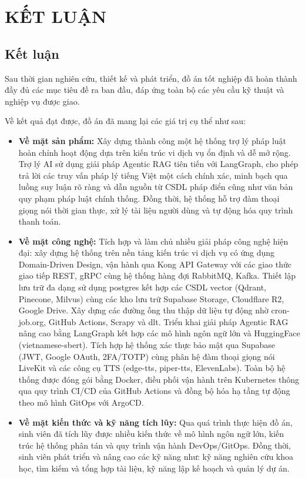 \newpage

{\centering \section*{KẾT LUẬN}}

\subsection*{Kết luận}

Sau thời gian nghiên cứu,
thiết kế và phát triển,
đồ án tốt nghiệp
đã hoàn thành đầy đủ các mục tiêu đề ra ban đầu,
đáp ứng toàn bộ các yêu cầu kỹ thuật
và nghiệp vụ được giao.

Về kết quả đạt được, đồ án đã mang lại các giá trị cụ thể như sau:

\begin{itemize}
\item \textbf{Về mặt sản phẩm:}
Xây dựng thành công một hệ thống trợ lý pháp luật hoàn chỉnh
hoạt động dựa trên kiến trúc vi dịch vụ
ổn định và dễ mở rộng.
Trợ lý AI sử dụng giải pháp Agentic RAG tiên tiến với LangGraph,
cho phép trả lời các truy vấn pháp lý tiếng Việt một cách chính xác,
minh bạch qua luồng suy luận rõ ràng và dẫn nguồn từ CSDL pháp điển cũng như văn bản quy phạm pháp luật chính thống.
Đồng thời, hệ thống hỗ trợ đàm thoại giọng nói thời gian thực, xử lý tài liệu người dùng và tự động hóa quy trình thanh toán.

\item \textbf{Về mặt công nghệ:}
Tích hợp và làm chủ nhiều giải pháp công nghệ hiện đại:
xây dựng hệ thống trên nền tảng kiến trúc vi dịch vụ
có ứng dụng Domain-Driven Design,
vận hành qua Kong API Gateway
với các giao thức giao tiếp REST, gRPC
cùng hệ thống hàng đợi RabbitMQ, Kafka.
Thiết lập lưu trữ đa dạng sử dụng postgres
kết hợp các CSDL vector (Qdrant, Pinecone, Milvus)
cùng các kho lưu trữ Supabase Storage, Cloudflare R2, Google Drive.
Xây dựng các đường ống thu thập dữ liệu
tự động nhờ cron-job.org, GitHub Actions, Scrapy và dlt.
Triển khai giải pháp Agentic RAG nâng cao bằng LangGraph
kết hợp các mô hình ngôn ngữ lớn
và HuggingFace (vietnamese-sbert).
Tích hợp hệ thống xác thực bảo mật qua Supabase (JWT, Google OAuth, 2FA/TOTP)
cùng phân hệ đàm thoại giọng nói LiveKit
và các công cụ TTS (edge-tts, piper-tts, ElevenLabs).
Toàn bộ hệ thống được đóng gói bằng Docker,
điều phối vận hành trên Kubernetes
thông qua quy trình CI/CD của GitHub Actions
và đồng bộ hóa hạ tầng tự động theo mô hình GitOps với ArgoCD.

\item \textbf{Về mặt kiến thức và kỹ năng tích lũy:}
Qua quá trình thực hiện đồ án,
sinh viên đã tích lũy được nhiều kiến thức
về
mô hình ngôn ngữ lớn,
kiến trúc hệ thống phân tán
và quy trình vận hành DevOps/GitOps.
Đồng thời, sinh viên phát triển
và nâng cao các kỹ năng như:
kỹ năng nghiên cứu khoa học,
tìm kiếm và tổng hợp tài liệu,
kỹ năng lập kế hoạch và quản lý dự án.

\end{itemize}


